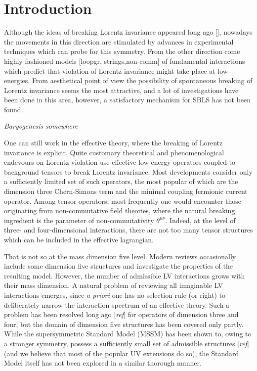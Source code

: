 \documentclass[12pt]{revtex4}
\begin{document}
\section{Introduction}

	
	Although the ideas of breaking Lorentz invariance appeared
	long ago [], nowadays the movements in this direction are
	stimulated by advances in experimental techniques which can
	probe for this symmetry.
	From the other direction come highly fashioned models [loopgr,
	strings,non-comm] of 
	fundamental interactions which predict that violation of 
	Lorentz invariance might take place at low energies.
	From aesthetical point of view the possibility of spontaneous
	breaking of Lorentz invariance seems the most attractive, 
	and a lot of investigations have been done in this
	area, however, a satisfactory mechanism for SBLS has not
	been found. 

{\Large\it Baryogenesis somewhere}

	One can still work in the effective theory, where the
	breaking of Lorentz invariance is explicit.
	Quite customary theoretical and phenomenological endevours on
	Lorentz violation use effective 
	low energy operators coupled to background tensors to break 
	Lorentz invariance.
	Most developments consider only a sufficiently limited set
	of such operators, the most popular of which are the dimension three
	Chern-Simons term and the minimal coupling fermionic current operator. 
	Among tensor operators, most frequently one would encounter 
	those originating from non-commutative field theories, where the
	natural breaking ingredient is the parameter of non-commutativity
	$ \theta^{\mu\nu} $.
	Indeed, at the level of three- and four-dimensional interactions,
	there are not too many tensor structures which can be included
	in the effective lagrangian.	

	That is not so at the mass dimension five level.
	Modern reviews occasionally include some dimension five structures
	and investigate the properties of the resulting model.
	However, the number of admissible LV interactions grows with their
	mass dimension.
	A natural problem of reviewing all imaginable LV interactions
	emerges, since {\it a priori} one has no selection rule (or right) to 
	deliberately narrow the interaction spectrum of an effective theory.
	Such a problem has been resolved long ago [{\it ref}] for operators of 
	dimension three and four, but the domain of dimension five structures has
	been covered only partly. 
	While the supersymmetric Standard Model (MSSM) has been shown to,
	owing to a stronger symmetry, possess a sufficiently small set of 
	admissible structures [{\it ref}] (and we believe that most of the
	popular UV extensions do so), the Standard Model itself has not 
	been explored in a similar thorough manner.
	
\end{document}
